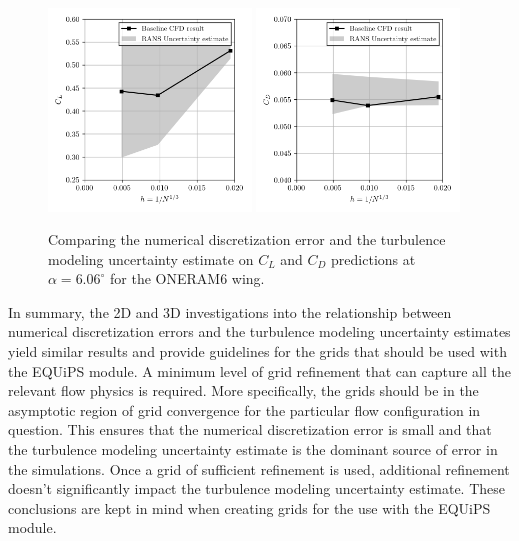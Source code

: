 \begin{figure}
\center
\subfigure%
  {\includegraphics[width=0.48\textwidth]{code/image_gen/oneram6/images/CL_06aoa.png}}
\subfigure%
  {\includegraphics[width=0.48\textwidth]{code/image_gen/oneram6/images/CD_06aoa.png}}
\caption{Comparing the numerical discretization error and the turbulence modeling uncertainty estimate on $C_L$ and $C_D$ predictions at $\alpha = 6.06^\circ$ for the ONERAM6 wing.}\label{fig:oneram6_6aoa}
\end{figure}

In summary, the 2D and 3D investigations into the relationship between numerical discretization errors and the turbulence modeling uncertainty estimates yield similar results and provide guidelines for the grids that should be used with the EQUiPS module.
A minimum level of grid refinement that can capture all the relevant flow physics is required.
More specifically, the grids should be in the asymptotic region of grid convergence for the particular flow configuration in question.
This ensures that the numerical discretization error is small and that the turbulence modeling uncertainty estimate is the dominant source of error in the simulations. 
Once a grid of sufficient refinement is used, additional refinement doesn't significantly impact the turbulence modeling uncertainty estimate.
These conclusions are kept in mind when creating grids for the use with the EQUiPS module. 